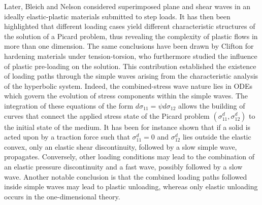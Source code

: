 Later, Bleich and Nelson \cite{Bleich} considered superimposed plane and shear waves in an ideally elastic-plastic materials submitted to step loads.
It has then been highlighted that different loading cases yield different characteristic structures of the solution of a Picard problem, thus revealing the complexity of plastic flows in more than one dimension.
The same conclusions have been drawn by Clifton \cite{Clifton} for hardening materials under tension-torsion, who furthermore studied the influence of plastic pre-loading on the solution.
This contribution established the existence of loading paths through the simple waves arising from the characteristic analysis of the hyperbolic system.
Indeed, the combined-stress wave nature lies in ODEs which govern the evolution of stress components within the simple waves.
The integration of these equations of the form $d\sigma_{11}=\psi d\sigma_{12}$ allows the building of curves that connect the applied stress state of the Picard problem $(\sigma^d_{11},\sigma^d_{12})$ to the initial state of the medium.
It has been for instance shown that if a solid is acted upon by a traction force such that $\sigma^d_{11}=0$ and $\sigma^d_{12}$ lies outside the elastic convex, only an elastic shear discontinuity, followed by a slow simple wave, propagates.
Conversely, other loading conditions may lead to the combination of an elastic pressure discontinuity and a fast wave, possibly followed by a slow wave.
Another notable conclusion is that the combined loading paths followed inside simple waves may lead to plastic unloading, whereas only elastic unloading occurs in the one-dimensional theory.

